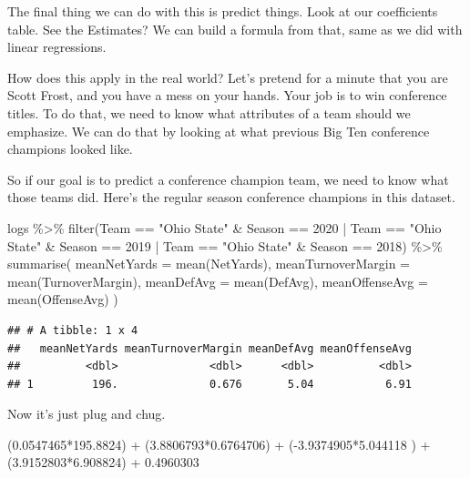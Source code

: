\documentclass[
]{book}
\newenvironment{Shaded}{\begin{snugshade}}{\end{snugshade}}
\newcommand{\AttributeTok}[1]{\textcolor[rgb]{0.77,0.63,0.00}{#1}}
\newcommand{\DecValTok}[1]{\textcolor[rgb]{0.00,0.00,0.81}{#1}}
\newcommand{\FloatTok}[1]{\textcolor[rgb]{0.00,0.00,0.81}{#1}}
\newcommand{\FunctionTok}[1]{\textcolor[rgb]{0.00,0.00,0.00}{#1}}
\newcommand{\NormalTok}[1]{#1}
\newcommand{\SpecialCharTok}[1]{\textcolor[rgb]{0.00,0.00,0.00}{#1}}
\newcommand{\StringTok}[1]{\textcolor[rgb]{0.31,0.60,0.02}{#1}}
\begin{document}
The final thing we can do with this is predict things. Look at our coefficients table. See the Estimates? We can build a formula from that, same as we did with linear regressions.

How does this apply in the real world? Let's pretend for a minute that you are Scott Frost, and you have a mess on your hands. Your job is to win conference titles. To do that, we need to know what attributes of a team should we emphasize. We can do that by looking at what previous Big Ten conference champions looked like.

So if our goal is to predict a conference champion team, we need to know what those teams did. Here's the regular season conference champions in this dataset.

\begin{Shaded}
\begin{Highlighting}[]
\NormalTok{logs }\SpecialCharTok{\%\textgreater{}\%} 
  \FunctionTok{filter}\NormalTok{(Team }\SpecialCharTok{==} \StringTok{"Ohio State"} \SpecialCharTok{\&}\NormalTok{ Season }\SpecialCharTok{==} \DecValTok{2020} \SpecialCharTok{|}\NormalTok{ Team }\SpecialCharTok{==} \StringTok{"Ohio State"} \SpecialCharTok{\&}\NormalTok{ Season }\SpecialCharTok{==} \DecValTok{2019} \SpecialCharTok{|}\NormalTok{ Team }\SpecialCharTok{==} \StringTok{"Ohio State"} \SpecialCharTok{\&}\NormalTok{ Season }\SpecialCharTok{==} \DecValTok{2018}\NormalTok{) }\SpecialCharTok{\%\textgreater{}\%} 
  \FunctionTok{summarise}\NormalTok{(}
    \AttributeTok{meanNetYards =} \FunctionTok{mean}\NormalTok{(NetYards),}
    \AttributeTok{meanTurnoverMargin =} \FunctionTok{mean}\NormalTok{(TurnoverMargin),}
    \AttributeTok{meanDefAvg =} \FunctionTok{mean}\NormalTok{(DefAvg),}
    \AttributeTok{meanOffenseAvg =} \FunctionTok{mean}\NormalTok{(OffenseAvg)}
\NormalTok{  )}
\end{Highlighting}
\end{Shaded}

\begin{verbatim}
## # A tibble: 1 x 4
##   meanNetYards meanTurnoverMargin meanDefAvg meanOffenseAvg
##          <dbl>              <dbl>      <dbl>          <dbl>
## 1         196.              0.676       5.04           6.91
\end{verbatim}

Now it's just plug and chug.

\begin{Shaded}
\begin{Highlighting}[]
\NormalTok{(}\FloatTok{0.0547465}\SpecialCharTok{*}\FloatTok{195.8824}\NormalTok{) }\SpecialCharTok{+}\NormalTok{ (}\FloatTok{3.8806793}\SpecialCharTok{*}\FloatTok{0.6764706}\NormalTok{) }\SpecialCharTok{+}\NormalTok{ (}\SpecialCharTok{{-}}\FloatTok{3.9374905}\SpecialCharTok{*}\FloatTok{5.044118}\NormalTok{ ) }\SpecialCharTok{+}\NormalTok{ (}\FloatTok{3.9152803}\SpecialCharTok{*}\FloatTok{6.908824}\NormalTok{) }\SpecialCharTok{+} \FloatTok{0.4960303}
\end{Highlighting}
\end{Shaded}
\end{document}
